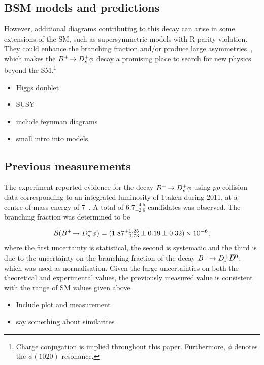 \subsection{BSM models and predictions}
{\color{Blue}
However, additional diagrams contributing to this decay can arise in some extensions of the SM, such as supersymmetric models with R-parity 
violation. They could enhance the branching fraction and/or produce large \CP asymmetries~\cite{Mohanta:2002wf, Mohanta:2007uu}, which makes the ${{{B}^+}}\!\rightarrow {\ensuremath{{D}^+_{s}}}\phi$ decay a promising place to search for new physics beyond the SM.\footnote{Charge conjugation is implied throughout this paper. Furthermore, $\phi$ denotes the $\phi(1020)$ resonance.}
}

{\color{Red}
\begin{itemize}
\item Higgs doublet
\item SUSY 
\item include feynman diagrams
\item small intro into models
\end{itemize}}

\subsection{Previous measurements}

{\color{Blue}
The \lhcb experiment reported evidence for the decay ${{{B}^+}}\!\rightarrow {\ensuremath{{D}^+_{s}}}\phi$ using $pp$ collision data corresponding to an integrated luminosity of 1\invfb taken during 2011, at a centre-of-mass energy of 7\tev~\cite{Aaij:2012zh}. A total of $6.7^{+4.5}_{-2.6}$ candidates was observed. The branching fraction was determined to be 

\begin{equation}
\mathcal{B}({{{B}^+}}\!\rightarrow {\ensuremath{{D}^+_{s}}}\phi) = (1.87^{+1.25}_{-0.73} \pm 0.19 \pm 0.32) \times 10^{-6},
\end{equation}
where the first uncertainty is statistical, the second is systematic and the third is due to the uncertainty on the branching fraction of the decay ${{{B}^+}}\!\rightarrow {\ensuremath{{D}^+_{s}}}{\ensuremath{{\kern 0.2em\overline{\kern -0.2em D}{}}{}^0}}$, which was used as normalisation. 
Given the large uncertainties on both the theoretical and experimental values, the previously measured value is consistent with the range of SM values given above.
}

{\color{Red}
\begin{itemize}
\item Include plot and measurement
\item say something about similarites 
\end{itemize}}


